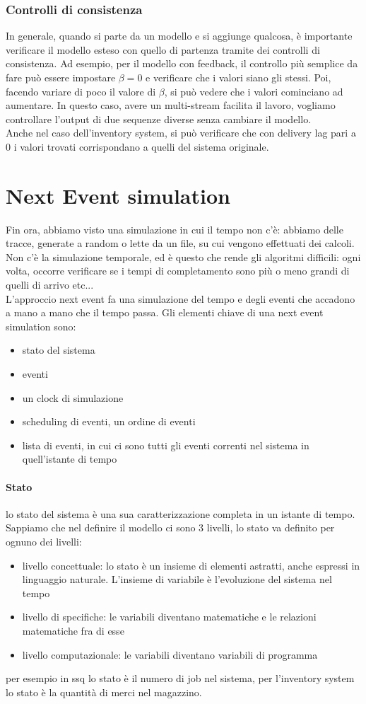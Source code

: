 \documentclass{article}
\begin{document}
\subsubsection{Controlli di consistenza}
In generale, quando si parte da un modello e si aggiunge qualcosa, è importante verificare il modello esteso con quello di partenza tramite dei controlli di consistenza. Ad esempio, per il modello con feedback, il controllo più semplice da fare può essere impostare $\beta = 0$ e verificare che i valori siano gli stessi. Poi, facendo variare di poco il valore di $\beta$, si può vedere che i valori cominciano ad aumentare. In questo caso, avere un multi-stream facilita il lavoro, vogliamo controllare l'output di due sequenze diverse senza cambiare il modello.\\ Anche nel caso dell'inventory system, si può verificare che con delivery lag pari a 0 i valori trovati corrispondano a quelli del sistema originale.
\section{Next Event simulation}
Fin ora, abbiamo visto una simulazione in cui il tempo non c'è: abbiamo delle tracce, generate a random o lette da un file, su cui vengono effettuati dei calcoli. Non c'è la simulazione temporale, ed è questo che rende gli algoritmi difficili: ogni volta, occorre verificare se i tempi di completamento sono più o meno grandi di quelli di arrivo etc...\\ L'approccio next event fa una simulazione del tempo e degli eventi che accadono a mano a mano che il tempo passa. Gli elementi chiave di una next event simulation sono:
\begin{itemize}
\item stato del sistema
\item eventi
\item un clock di simulazione
\item scheduling di eventi, un ordine di eventi
\item lista di eventi, in cui ci sono tutti gli eventi correnti nel sistema in quell'istante di tempo
\end{itemize}
\paragraph{Stato}lo stato del sistema è una sua caratterizzazione completa in un istante di tempo. Sappiamo che nel definire il modello ci sono 3 livelli, lo stato va definito per ognuno dei livelli:
\begin{itemize}
\item livello concettuale: lo stato è un insieme di elementi astratti, anche espressi in linguaggio naturale. L'insieme di variabile è l'evoluzione del sistema nel tempo
\item livello di specifiche: le variabili diventano matematiche e le relazioni matematiche fra di esse
\item livello computazionale: le variabili diventano variabili di programma
\end{itemize}
per esempio in ssq lo stato è il numero di job nel sistema, per l'inventory system lo stato è la quantità di merci nel magazzino.
\end{document}
